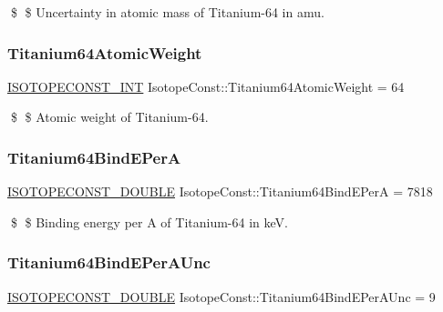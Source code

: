 \$ \$ Uncertainty in atomic mass of Titanium-\/64 in amu. \mbox{\label{group___isotope_const-_titanium-_ti64_ga70f93a2d7235cb5369e21e196b457990}} 
\subsubsection{\texorpdfstring{Titanium64\+Atomic\+Weight}{Titanium64AtomicWeight}}
{\footnotesize\ttfamily \mbox{\hyperlink{group___isotope_const-_macros_ga5f18360b3e99483a35c32d789e62621c}{I\+S\+O\+T\+O\+P\+E\+C\+O\+N\+S\+T\+\_\+\+I\+NT}} Isotope\+Const\+::\+Titanium64\+Atomic\+Weight = 64}

\$ \$ Atomic weight of Titanium-\/64. \mbox{\label{group___isotope_const-_titanium-_ti64_ga465cc9e1f32b650dbd7ceb182ef112c6}} 
\subsubsection{\texorpdfstring{Titanium64\+Bind\+E\+PerA}{Titanium64BindEPerA}}
{\footnotesize\ttfamily \mbox{\hyperlink{group___isotope_const-_macros_ga8f45a7272ce02c0b4c65c44636ed719a}{I\+S\+O\+T\+O\+P\+E\+C\+O\+N\+S\+T\+\_\+\+D\+O\+U\+B\+LE}} Isotope\+Const\+::\+Titanium64\+Bind\+E\+PerA = 7818}

\$ \$ Binding energy per A of Titanium-\/64 in keV. \mbox{\label{group___isotope_const-_titanium-_ti64_ga28cbe7d89527adf2d0f5df9741d783de}} 
\subsubsection{\texorpdfstring{Titanium64\+Bind\+E\+Per\+A\+Unc}{Titanium64BindEPerAUnc}}
{\footnotesize\ttfamily \mbox{\hyperlink{group___isotope_const-_macros_ga8f45a7272ce02c0b4c65c44636ed719a}{I\+S\+O\+T\+O\+P\+E\+C\+O\+N\+S\+T\+\_\+\+D\+O\+U\+B\+LE}} Isotope\+Const\+::\+Titanium64\+Bind\+E\+Per\+A\+Unc = 9}

